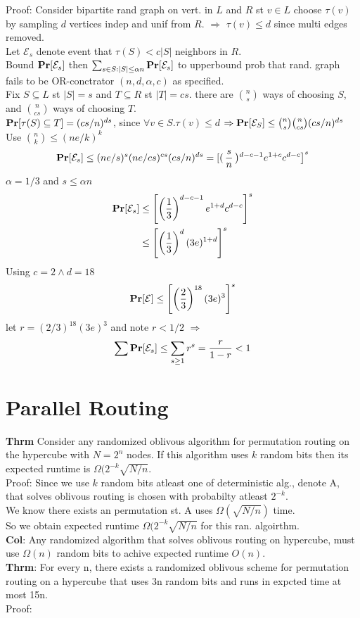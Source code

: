 \documentclass[a4paper]{article}
\def\Pr{\mbox{\textbf{Pr}}}
\begin{document}
Proof: Consider bipartite rand graph on vert. in \(L\) and \(R\) st \(v\in L\) choose \(\tau(v)\) by sampling \(d\) vertices indep and unif from \(R\). \(\Rightarrow\) \(\tau(v) \leq d\) since multi edges removed.\\
Let \(\mathcal{E}_s\) denote event that \(\tau(S) < c|S|\) neighbors in \(R\).\\
Bound \(\Pr[\mathcal{E}_s]\) then \(\sum_{s\in S: |S| \leq \alpha n} \Pr[\mathcal{E}_s]\) to upperbound prob that rand. graph fails to be OR-conctrator \((n,d,\alpha,c)\) as specified.\\
Fix \(S\subseteq L\) st \(|S|=s\) and \(T\subseteq R\) st \(|T|=cs\). there are \({n \choose s}\) ways of choosing \(S\), and \({n \choose cs}\) ways of choosing \(T\).\\
\(\Pr[\tau(S) \subseteq T] = (cs/n)^{ds}\), since \(\forall v\in S.\tau(v) \leq d\) \(\Rightarrow \Pr[\mathcal{E}_S] \leq {n \choose s} {n \choose cs} (cs/n)^{ds}\)\\
Use \({n \choose k} \leq (ne/k)^k\)
\[\Pr[\mathcal{E}_s]\leq (ne/s)^s(ne/cs)^{cs}(cs/n)^{ds}  = \left[\right(\frac{s}{n}\left)^{d-c-1} e^{1+c} c^{d-c}\right]^s\]
\(\alpha = 1/3\) and \(s \leq \alpha n\)\\
\begin{align*}
\Pr[\mathcal{E}_s] &\leq \left[\left(\frac{1}{3}\right)^{d-c-1} e^{1+d} c^{d-c}\right]^s\\
                   &\leq \left[\left(\frac{1}{3}\right)^{d} (3e)^{1+d}\right]^s
\end{align*}
Using \(c=2 \wedge d=18\)
\[\Pr[\mathcal{E}] \leq \left[\left(\frac{2}{3}\right)^{18}(3e)^3\right]^s\]
let \(r=(2/3)^{18}(3e)^3\) and note \(r < 1/2\) \(\Rightarrow\)
\[\sum \Pr[\mathcal{E}_s] \leq \sum_{s\geq 1} r^s = \frac{r}{1-r} < 1\]
\section{Parallel Routing}
\textbf{Thrm} Consider any randomized oblivous algorithm for permutation routing on the hypercube with \(N = 2^n\) nodes. If this algorithm uses \(k\) random bits then its expected runtime is \(\Omega(2^{-k} \sqrt{N/n}\).\\
Proof: Since we use \(k\) random bits atleast one of deterministic alg., denote A, that solves oblivous routing is chosen with probabilty atleast \(2^{-k}\). \\
We know there exists an permutation st. A uses \(\Omega(\sqrt{N/n})\) time.\\
So we obtain expected runtime \(\Omega(2^{-k} \sqrt{N/n}\) for this ran. algoirthm.\\
\textbf{Col}: Any randomized algorithm that solves oblivous routing on hypercube, must use \(\Omega(n)\) random bits to achive expected runtime \(O(n)\).\\
\textbf{Thrm}: For every n, there exists a randomized oblivous scheme for permutation routing on a hypercube that uses 3n random bits and runs in expcted time at most 15n.\\
Proof:
\end{document}
